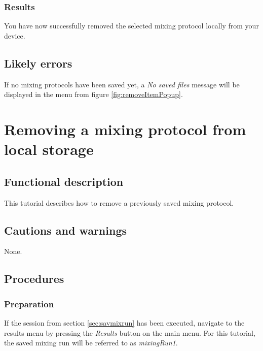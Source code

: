 \subsubsection{Results}
You have now successfully removed the selected mixing protocol locally from your device.

\subsection{Likely errors}
If no mixing protocols have been saved yet, a \emph{No saved files} message will be displayed in the menu from figure \ref{fig:removeItemPopup}.

\section{Removing a mixing protocol from local storage}\label{sec:remmixrun}

\subsection{Functional description}
This tutorial describes how to remove a previously saved mixing protocol.

\subsection{Cautions and warnings}
None.

\subsection{Procedures}

\subsubsection{Preparation}
If the session from section \ref{sec:savmixrun} has been executed, navigate to the results menu by pressing the \emph{Results} button on the main menu. 
For this tutorial, the saved mixing run will be referred to as \emph{mixingRun1}.

